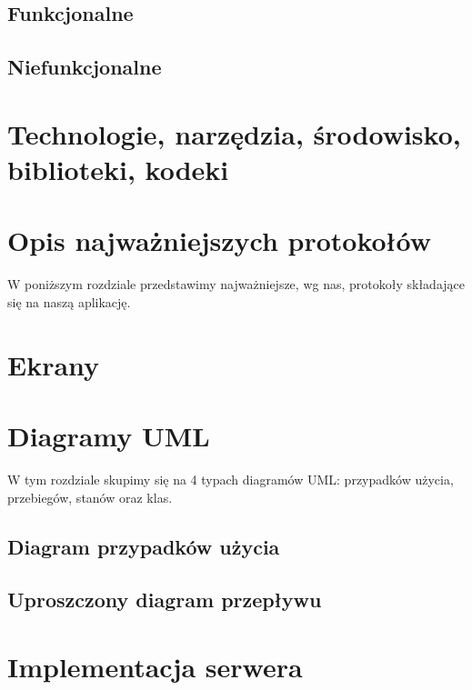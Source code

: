\documentclass{article}
\begin{document}
	\subsection{Funkcjonalne}
	
	\subsection{Niefunkcjonalne}
	
	\section{Technologie, narzędzia, środowisko, biblioteki, kodeki}
	
	\color{red}
	\section{Opis najważniejszych protokołów}
	W poniższym rozdziale przedstawimy najważniejsze, wg nas, protokoły składające się na naszą aplikację.
	
	\color{black}
	\section{Ekrany}
	

	\section{Diagramy UML}
	{W tym rozdziale skupimy się na 4 typach diagramów UML: przypadków użycia, przebiegów, stanów oraz klas.}
	\subsection{Diagram przypadków użycia}
	
	\subsection{Uproszczony diagram przepływu}
	
	\section{Implementacja serwera}
	
\end{document}
